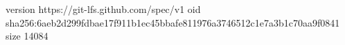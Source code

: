 version https://git-lfs.github.com/spec/v1
oid sha256:6aeb2d299fdbae17f911b1ec45bbafe811976a3746512c1e7a3b1c70aa9f0841
size 14084
